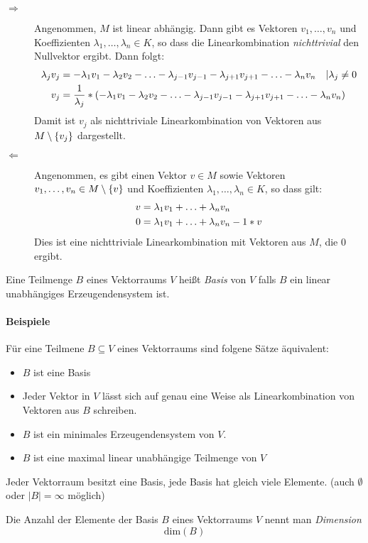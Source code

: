 \begin{description}
  \newcommand{\lv}[1]{\ensuremath\lambda_{#1}v_{#1}}
  \item[\glqq$\Rightarrow$\grqq] Angenommen, $M$ ist linear abhängig. Dann gibt es Vektoren $v_1,\ldots,v_n$ und Koeffizienten $\lambda_1,\ldots,\lambda_n \in K$, so dass die Linearkombination \emph{nichttrivial} den Nullvektor ergibt. Dann folgt:
  \begin{align*}
    \lv{j} &= -\lv{1}-\lv{2}-\ldots-\lv{j-1}-\lv{j+1}-\ldots-\lv{n} \quad |\lambda_j\neq0\\
    v_j &= \frac{1}{\lambda_j} * \left( -\lv{1}-\lv{2}-\ldots-\lv{j-1}-\lv{j+1}-\ldots-\lv{n} \right)
  \end{align*}
  Damit ist $v_j$ als nichttriviale Linearkombination von Vektoren aus $M\setminus\left\{ v_j \right\}$ dargestellt.


  \item[\glqq$\Leftarrow$\grqq] Angenommen, es gibt einen Vektor $v\in M$ sowie Vektoren $v_1,\ldots,v_n\in M\setminus\left\{ v \right\}$ und Koeffizienten $\lambda_1,\ldots,\lambda_n \in K$, so dass gilt:
  \begin{align*}
    v &= \lv{1}+\ldots+\lv{n}\\
    0 &= \lv{1}+\ldots+\lv{n} - 1*v
  \end{align*}
  Dies ist eine nichttriviale Linearkombination mit Vektoren aus $M$, die $0$ ergibt.
\end{description}


Eine Teilmenge $B$ eines Vektorraums $V$ heißt \emph{Basis} von $V$ falls $B$ ein linear unabhängiges Erzeugendensystem ist.

\paragraph{Beispiele}

Für eine Teilmene $B\subseteq V$ eines Vektorraums sind folgene Sätze äquivalent:
\begin{itemize}
  \item $B$ ist eine Basis
  \item Jeder Vektor in $V$ lässt sich auf genau eine Weise als Linearkombination von Vektoren aus $B$ schreiben.
  \item $B$ ist ein minimales Erzeugendensystem von $V$.
  \item $B$ ist eine maximal linear unabhängige Teilmenge von $V$
\end{itemize}
\bemerkung
Jeder Vektorraum besitzt eine Basis, jede Basis hat gleich viele Elemente. (auch $\emptyset$ oder $|B|=\infty$ möglich)

Die Anzahl der Elemente der Basis $B$ eines Vektorraums $V$ nennt man \emph{Dimension}
\begin{equation*}
  \mathrm{dim}(B)
\end{equation*}
